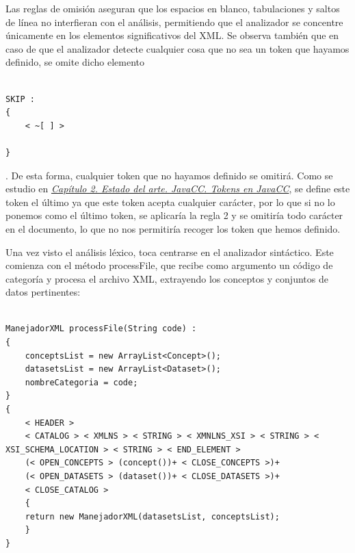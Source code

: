 Las reglas de omisión aseguran que los espacios en blanco, tabulaciones y saltos de línea no interfieran con el análisis, permitiendo que el analizador se concentre únicamente en los elementos significativos del XML. Se observa también que en caso de que el analizador detecte cualquier cosa que no sea un token que hayamos definido, se omite dicho elemento

\lstset{inputencoding=utf8/latin1}
\begin{lstlisting}

SKIP :
{
    < ~[ ] >

}

\end{lstlisting}

. De esta forma, cualquier token que no hayamos definido se omitirá. Como se estudio en \hyperref[sec:tokensenjavacc]{\textit{Capítulo 2. Estado del arte. JavaCC. Tokens en JavaCC}}, se define este token el último ya que este token acepta cualquier carácter, por lo que si no lo ponemos como el último token, se aplicaría la regla 2 y se omitiría todo carácter en el documento, lo que no nos permitiría recoger los token que hemos definido.


Una vez visto el análisis léxico, toca centrarse en el analizador sintáctico. Este comienza con el método processFile, que recibe como argumento un código de categoría y procesa el archivo XML, extrayendo los conceptos y conjuntos de datos pertinentes:

\lstset{inputencoding=utf8/latin1}
\begin{lstlisting}

ManejadorXML processFile(String code) :
{
    conceptsList = new ArrayList<Concept>();
    datasetsList = new ArrayList<Dataset>();
    nombreCategoria = code;
}
{
    < HEADER > 
    < CATALOG > < XMLNS > < STRING > < XMNLNS_XSI > < STRING > < XSI_SCHEMA_LOCATION > < STRING > < END_ELEMENT >
    (< OPEN_CONCEPTS > (concept())+ < CLOSE_CONCEPTS >)+
    (< OPEN_DATASETS > (dataset())+ < CLOSE_DATASETS >)+
    < CLOSE_CATALOG >
    {
    return new ManejadorXML(datasetsList, conceptsList);
    }
}
    
\end{lstlisting}

